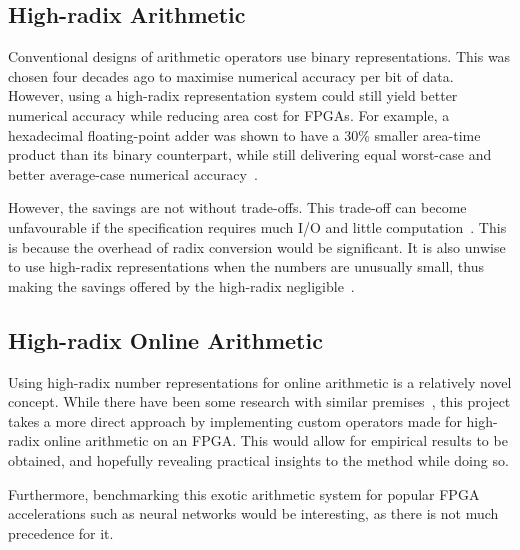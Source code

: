 \subsection{High-radix Arithmetic}
Conventional designs of arithmetic operators use binary representations.
This was chosen four decades ago to maximise numerical accuracy per bit of data.
However, using a high-radix representation system could still yield better
numerical accuracy while reducing area cost for FPGAs.
For example, a hexadecimal floating-point adder was shown to have a 30\% smaller
area-time product than its binary counterpart, while still delivering equal
worst-case and better average-case numerical accuracy~\cite{Catanzaro1}.

However, the savings are not without trade-offs.
This trade-off can become unfavourable if the specification requires much I/O
and little computation~\cite{Whyte1}.
This is because the overhead of radix conversion would be significant.
It is also unwise to use high-radix representations when the numbers are
unusually small, thus making the savings offered by the high-radix
negligible~\cite{Catanzaro1}.

\subsection{High-radix Online Arithmetic}
Using high-radix number representations for online arithmetic is a
relatively novel concept.
While there have been some research with similar
premises~\cite{Lynch1}\cite{Lynch2},
this project takes a more direct approach by implementing custom operators
made for high-radix online arithmetic on an FPGA.
This would allow for empirical results to be obtained, and hopefully revealing
practical insights to the method while doing so.

Furthermore, benchmarking this exotic arithmetic system for popular FPGA
accelerations such as neural networks would be interesting, as there is not
much precedence for it.